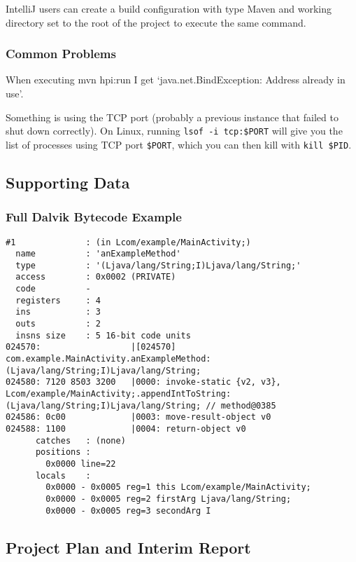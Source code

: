 IntelliJ users can create a build configuration with type Maven and working
directory set to the root of the project to execute the same command.

\subsubsection{Common Problems}

When executing mvn hpi:run I get {\lq}java.net.BindException: Address already in
use{\rq}.

Something is using the TCP port (probably a previous instance that failed to
shut down correctly). On Linux, running {\tt lsof -i tcp:\$PORT} will give you
the list of processes using TCP port {\tt\$PORT}, which you can then kill with
{\tt kill \$PID}.


\subsection{Supporting Data}

\subsubsection{Full Dalvik Bytecode Example}
\label{sec:sec:full_dalvik_bytecode_example}

\begin{lstlisting}
#1              : (in Lcom/example/MainActivity;)
  name          : 'anExampleMethod'
  type          : '(Ljava/lang/String;I)Ljava/lang/String;'
  access        : 0x0002 (PRIVATE)
  code          -
  registers     : 4
  ins           : 3
  outs          : 2
  insns size    : 5 16-bit code units
024570:                  |[024570] com.example.MainActivity.anExampleMethod:(Ljava/lang/String;I)Ljava/lang/String;
024580: 7120 8503 3200   |0000: invoke-static {v2, v3}, Lcom/example/MainActivity;.appendIntToString:(Ljava/lang/String;I)Ljava/lang/String; // method@0385
024586: 0c00             |0003: move-result-object v0
024588: 1100             |0004: return-object v0
      catches   : (none)
      positions :
        0x0000 line=22
      locals    :
        0x0000 - 0x0005 reg=1 this Lcom/example/MainActivity;
        0x0000 - 0x0005 reg=2 firstArg Ljava/lang/String;
        0x0000 - 0x0005 reg=3 secondArg I
\end{lstlisting}

\subsection{Project Plan and Interim Report}

